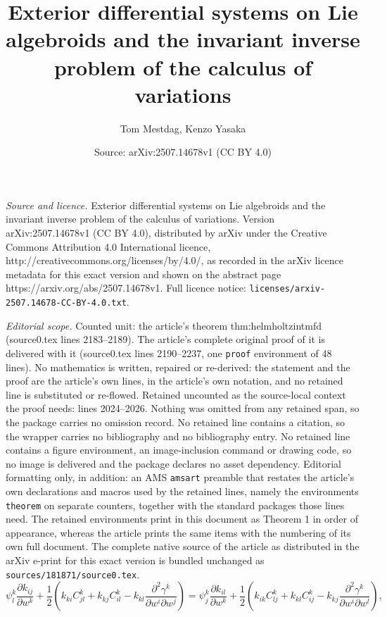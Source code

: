 \documentclass[10pt,a4paper]{amsart}
\title{Exterior differential systems on Lie algebroids and the invariant inverse problem of the calculus of variations}
\author{Tom Mestdag, Kenzo Yasaka}
\date{Source: arXiv:2507.14678v1 (CC BY 4.0)}
\begin{document}
\maketitle

\noindent\emph{Source and licence.} Exterior differential systems on Lie algebroids and the invariant inverse problem of the calculus of variations. Version arXiv:2507.14678v1 (CC BY 4.0), distributed by arXiv under the Creative Commons Attribution 4.0 International licence, http://creativecommons.org/licenses/by/4.0/, as recorded in the arXiv licence metadata for this exact version and shown on the abstract page https://arxiv.org/abs/2507.14678v1. Full licence notice: \texttt{licenses/arxiv-2507.14678-CC-BY-4.0.txt}.\par\smallskip

\noindent\textit{Editorial scope.} Counted unit: the article's theorem thm:helmholtzintmfd (source0.tex lines 2183--2189). The article's complete original proof of it is delivered with it (source0.tex lines 2190--2237, one \texttt{proof} environment of 48 lines). No mathematics is written, repaired or re-derived: the statement and the proof are the article's own lines, in the article's own notation, and no retained line is substituted or re-flowed.  Retained uncounted as the source-local context the proof needs: lines 2024--2026.  Nothing was omitted from any retained span, so the package carries no omission record.  No retained line contains a citation, so the wrapper carries no bibliography and no bibliography entry.  No retained line contains a figure environment, an image-inclusion command or drawing code, so no image is delivered and the package declares no asset dependency.  Editorial formatting only, in addition: an AMS \texttt{amsart} preamble that restates the article's own declarations and macros used by the retained lines, namely the environments \texttt{theorem} on separate counters, together with the standard packages those lines need.  The retained environments print in this document as Theorem 1 in order of appearance, whereas the article prints the same items with the numbering of its own full document.  The complete native source of the article as distributed in the arXiv e-print for this exact version is bundled unchanged as \texttt{sources/181871/source0.tex}.
\begin{equation}\label{eqn:redundanthelmholtz1}
    \psi_l^k \frac{\partial k_{ij}}{\partial w^k}+\frac{1}{2}\left(k_{ki}C_{jl}^k+k_{kj}C_{il}^k-k_{kl}\frac{\partial^2 \gamma^k}{\partial w^i \partial w^j}\right)=\psi_j^k \frac{\partial k_{il}}{\partial w^k}+\frac{1}{2}\left(k_{ik} C_{lj}^k+k_{kl} C_{ij}^k-k_{kj}\frac{\partial^2 \gamma^k}{\partial w^i \partial w^l}\right),
\end{equation}
\end{document}
